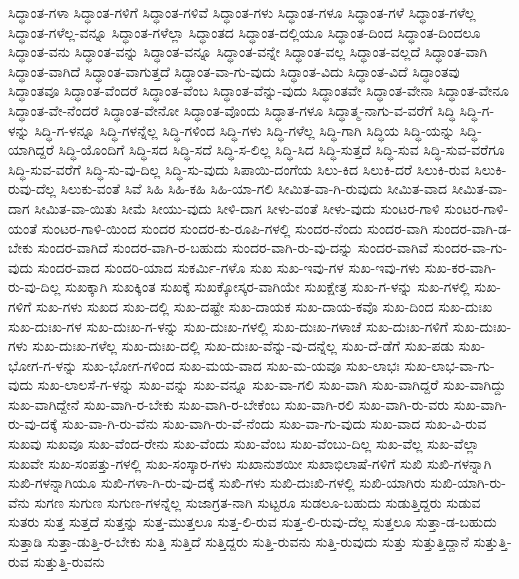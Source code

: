 {ಸಿದ್ಧಾಂತ-ಗಳಾ
ಸಿದ್ಧಾಂತ-ಗಳಿಗೆ
ಸಿದ್ಧಾಂತ-ಗಳಿವೆ
ಸಿದ್ಧಾಂತ-ಗಳು
ಸಿದ್ಧಾಂತ-ಗಳೂ
ಸಿದ್ಧಾಂತ-ಗಳೆ
ಸಿದ್ಧಾಂತ-ಗಳೆಲ್ಲ
ಸಿದ್ಧಾಂತ-ಗಳೆಲ್ಲ-ವನ್ನೂ
ಸಿದ್ಧಾಂತ-ಗಳೆಲ್ಲಾ
ಸಿದ್ಧಾಂತದ
ಸಿದ್ಧಾಂತ-ದಲ್ಲಿಯೂ
ಸಿದ್ಧಾಂತ-ದಿಂದ
ಸಿದ್ಧಾಂತ-ದಿಂದಲೂ
ಸಿದ್ಧಾಂತ-ವನು
ಸಿದ್ಧಾಂತ-ವನ್ನು
ಸಿದ್ಧಾಂತ-ವನ್ನೂ
ಸಿದ್ಧಾಂತ-ವನ್ನೇ
ಸಿದ್ಧಾಂತ-ವಲ್ಲ
ಸಿದ್ಧಾಂತ-ವಲ್ಲದೆ
ಸಿದ್ಧಾಂತ-ವಾಗಿ
ಸಿದ್ಧಾಂತ-ವಾಗಿದೆ
ಸಿದ್ಧಾಂತ-ವಾಗುತ್ತದೆ
ಸಿದ್ಧಾಂತ-ವಾ-ಗು-ವುದು
ಸಿದ್ಧಾಂತ-ವಿದು
ಸಿದ್ಧಾಂತ-ವಿದೆ
ಸಿದ್ಧಾಂತವು
ಸಿದ್ಧಾಂತವೂ
ಸಿದ್ಧಾಂತ-ವೆಂದರೆ
ಸಿದ್ಧಾಂತ-ವೆಂಬ
ಸಿದ್ಧಾಂತ-ವೆನ್ನು-ವುದು
ಸಿದ್ಧಾಂತವೇ
ಸಿದ್ಧಾಂತ-ವೇನಾ
ಸಿದ್ಧಾಂತ-ವೇನೂ
ಸಿದ್ಧಾಂತ-ವೇ-ನೆಂದರೆ
ಸಿದ್ಧಾಂತ-ವೇನೋ
ಸಿದ್ಧಾಂತ-ವೊಂದು
ಸಿದ್ಧಾತ-ಗಳೂ
ಸಿದ್ಧಾತ್ಮ-ನಾಗು-ವ-ವರೆಗೆ
ಸಿದ್ಧಿ
ಸಿದ್ಧಿ-ಗ-ಳನ್ನು
ಸಿದ್ಧಿ-ಗ-ಳನ್ನೂ
ಸಿದ್ಧಿ-ಗಳನ್ನೆಲ್ಲ
ಸಿದ್ಧಿ-ಗಳಿಂದ
ಸಿದ್ಧಿ-ಗಳು
ಸಿದ್ಧಿ-ಗಳೆಲ್ಲ
ಸಿದ್ಧಿ-ಗಾಗಿ
ಸಿದ್ಧಿಯ
ಸಿದ್ಧಿ-ಯನ್ನು
ಸಿದ್ಧಿ-ಯಾಗಿದ್ದರೆ
ಸಿದ್ಧಿ-ಯೊಂದಿಗೆ
ಸಿದ್ಧಿ-ಸದ
ಸಿದ್ಧಿ-ಸದೆ
ಸಿದ್ಧಿ-ಸ-ಲಿಲ್ಲ
ಸಿದ್ಧಿ-ಸಿದ
ಸಿದ್ಧಿ-ಸುತ್ತದೆ
ಸಿದ್ಧಿ-ಸುವ
ಸಿದ್ಧಿ-ಸುವ-ವರೆಗೂ
ಸಿದ್ಧಿ-ಸುವ-ವರೆಗೆ
ಸಿದ್ಧಿ-ಸು-ವು-ದಿಲ್ಲ
ಸಿದ್ಧಿ-ಸು-ವುದು
ಸಿಪಾಯಿ-ದಂಗೆಯ
ಸಿಲು-ಕಿದ
ಸಿಲುಕಿ-ದರೆ
ಸಿಲುಕಿ-ರುವ
ಸಿಲುಕಿ-ರುವು-ದೆಲ್ಲ
ಸಿಲುಕು-ವಂತೆ
ಸಿವೆ
ಸಿಹಿ
ಸಿಹಿ-ಕಹಿ
ಸಿಹಿ-ಯಾ-ಗಲಿ
ಸೀಮಿತ-ವಾ-ಗಿ-ರುವುದು
ಸೀಮಿತ-ವಾದ
ಸೀಮಿತ-ವಾ-ದಾಗ
ಸೀಮಿತ-ವಾ-ಯಿತು
ಸೀಮೆ
ಸೀಯು-ವುದು
ಸೀಳಿ-ದಾಗ
ಸೀಳು-ವಂತೆ
ಸೀಳು-ವುದು
ಸುಂಟರ-ಗಾಳಿ
ಸುಂಟರ-ಗಾಳಿ-ಯಂತೆ
ಸುಂಟರ-ಗಾಳಿ-ಯಿಂದ
ಸುಂದರ
ಸುಂದರ-ಕು-ರೂಪಿ-ಗಳಲ್ಲಿ
ಸುಂದರ-ನೆಂದು
ಸುಂದರ-ವಾಗಿ
ಸುಂದರ-ವಾಗಿ-ಡ-ಬೇಕು
ಸುಂದರ-ವಾಗಿದೆ
ಸುಂದರ-ವಾಗಿ-ರ-ಬಹುದು
ಸುಂದರ-ವಾಗಿ-ರು-ವು-ದನ್ನು
ಸುಂದರ-ವಾಗಿವೆ
ಸುಂದರ-ವಾ-ಗು-ವುದು
ಸುಂದರ-ವಾದ
ಸುಂದರಿ-ಯಾದ
ಸುಕರ್ಮಿ-ಗಳೊ
ಸುಖ
ಸುಖ-ಇವು-ಗಳ
ಸುಖ-ಇವು-ಗಳು
ಸುಖ-ಕರ-ವಾಗಿ-ರು-ವು-ದಿಲ್ಲ
ಸುಖಕ್ಕಾಗಿ
ಸುಖಕ್ಕಿಂತ
ಸುಖಕ್ಕೆ
ಸುಖಕ್ಕೋಸ್ಕರ-ವಾಗಿಯೇ
ಸುಖಕ್ಷೇತ್ರ
ಸುಖ-ಗ-ಳನ್ನು
ಸುಖ-ಗಳಲ್ಲಿ
ಸುಖ-ಗಳಿಗೆ
ಸುಖ-ಗಳು
ಸುಖದ
ಸುಖ-ದಲ್ಲಿ
ಸುಖ-ದಷ್ಟೇ
ಸುಖ-ದಾಯಕ
ಸುಖ-ದಾಯ-ಕವೊ
ಸುಖ-ದಿಂದ
ಸುಖ-ದುಃಖ
ಸುಖ-ದುಃಖ-ಗಳ
ಸುಖ-ದುಃಖ-ಗ-ಳನ್ನು
ಸುಖ-ದುಃಖ-ಗಳಲ್ಲಿ
ಸುಖ-ದುಃಖ-ಗಳಾಚೆ
ಸುಖ-ದುಃಖ-ಗಳಿಗೆ
ಸುಖ-ದುಃಖ-ಗಳು
ಸುಖ-ದುಃಖ-ಗಳೆಲ್ಲ
ಸುಖ-ದುಃಖ-ದಲ್ಲಿ
ಸುಖ-ದುಃಖ-ವೆನ್ನು-ವು-ದನ್ನೆಲ್ಲ
ಸುಖ-ದೆ-ಡೆಗೆ
ಸುಖ-ಪಡು
ಸುಖ-ಭೋಗ-ಗ-ಳನ್ನು
ಸುಖ-ಭೋಗ-ಗಳಿಂದ
ಸುಖ-ಮಯ-ವಾದ
ಸುಖ-ಮ-ಯವೂ
ಸುಖ-ಲಾಭಃ
ಸುಖ-ಲಾಭ-ವಾ-ಗು-ವುದು
ಸುಖ-ಲಾಲಸೆ-ಗ-ಳನ್ನು
ಸುಖ-ವನ್ನು
ಸುಖ-ವನ್ನೂ
ಸುಖ-ವಾ-ಗಲಿ
ಸುಖ-ವಾಗಿ
ಸುಖ-ವಾಗಿದ್ದರೆ
ಸುಖ-ವಾಗಿದ್ದು
ಸುಖ-ವಾಗಿದ್ದೇನೆ
ಸುಖ-ವಾಗಿ-ರ-ಬೇಕು
ಸುಖ-ವಾಗಿ-ರ-ಬೇಕೆಂಬ
ಸುಖ-ವಾಗಿ-ರಲಿ
ಸುಖ-ವಾಗಿ-ರು-ವರು
ಸುಖ-ವಾಗಿ-ರು-ವು-ದಕ್ಕೆ
ಸುಖ-ವಾ-ಗಿ-ರು-ವೆನು
ಸುಖ-ವಾಗಿ-ರು-ವೆ-ನೆಂದು
ಸುಖ-ವಾ-ಗು-ವುದು
ಸುಖ-ವಾದ
ಸುಖ-ವಿ-ರುವ
ಸುಖವು
ಸುಖವೂ
ಸುಖ-ವೆಂದ-ರೇನು
ಸುಖ-ವೆಂದು
ಸುಖ-ವೆಂಬ
ಸುಖ-ವೆಂಬು-ದಿಲ್ಲ
ಸುಖ-ವೆಲ್ಲ
ಸುಖ-ವೆಲ್ಲಾ
ಸುಖವೇ
ಸುಖ-ಸಂಪತ್ತು-ಗಳಲ್ಲಿ
ಸುಖ-ಸಂಸ್ಕಾರ-ಗಳು
ಸುಖಾನುಶಯೀ
ಸುಖಾಭಿಲಾಷೆ-ಗಳಿಗೆ
ಸುಖಿ
ಸುಖಿ-ಗಳನ್ನಾಗಿ
ಸುಖಿ-ಗಳನ್ನಾಗಿಯೂ
ಸುಖಿ-ಗಳಾ-ಗಿ-ರು-ವು-ದಕ್ಕೆ
ಸುಖಿ-ಗಳು
ಸುಖಿ-ದುಃಖಿ-ಗಳಲ್ಲಿ
ಸುಖಿ-ಯಾಗಿರು
ಸುಖಿ-ಯಾಗಿ-ರು-ವೆನು
ಸುಗಣ
ಸುಗುಣ
ಸುಗುಣ-ಗಳನ್ನೆಲ್ಲ
ಸುಜಾಗ್ರತ-ನಾಗಿ
ಸುಟ್ಟರೂ
ಸುಡಲೂ-ಬಹುದು
ಸುಡುತ್ತಿದ್ದರು
ಸುಡುವ
ಸುತರು
ಸುತ್ತ
ಸುತ್ತದೆ
ಸುತ್ತನ್ನು
ಸುತ್ತ-ಮುತ್ತಲೂ
ಸುತ್ತ-ಲಿ-ರುವ
ಸುತ್ತ-ಲಿ-ರುವು-ದೆಲ್ಲ
ಸುತ್ತಲೂ
ಸುತ್ತಾ-ಡ-ಬಹುದು
ಸುತ್ತಾಡಿ
ಸುತ್ತಾ-ಡುತ್ತಿ-ರ-ಬೇಕು
ಸುತ್ತಿ
ಸುತ್ತಿದೆ
ಸುತ್ತಿದ್ದರು
ಸುತ್ತಿ-ರುವನು
ಸುತ್ತಿ-ರುವುದು
ಸುತ್ತು
ಸುತ್ತುತ್ತಿದ್ದಾನೆ
ಸುತ್ತುತ್ತಿ-ರುವ
ಸುತ್ತುತ್ತಿ-ರುವನು
}
